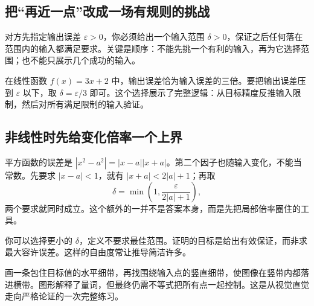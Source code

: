 \subsection*{把“再近一点”改成一场有规则的挑战}
对方先指定输出误差 $\varepsilon>0$，你必须给出一个输入范围 $\delta>0$，保证之后任何落在范围内的输入都满足要求。关键是顺序：不能先挑一个有利的输入，再为它选择范围；也不能只展示几个成功的输入。

在线性函数 $f(x)=3x+2$ 中，输出误差恰为输入误差的三倍。要把输出误差压到 $\varepsilon$ 以下，取 $\delta=\varepsilon/3$ 即可。这个选择展示了完整逻辑：从目标精度反推输入限制，然后对所有满足限制的输入验证。

\subsection*{非线性时先给变化倍率一个上界}
平方函数的误差是 $|x^2-a^2|=|x-a||x+a|$。第二个因子也随输入变化，不能当常数。先要求 $|x-a|<1$，就有 $|x+a|<2|a|+1$；再取
\[\delta=\min\!\left(1,\frac{\varepsilon}{2|a|+1}\right),\]
两个要求就同时成立。这个额外的一并不是答案本身，而是先把局部倍率圈住的工具。

你可以选择更小的 $\delta$，定义不要求最佳范围。证明的目标是给出有效保证，而非求最大容许误差。这样的自由度常让推导简洁许多。

画一条包住目标值的水平细带，再找围绕输入点的竖直细带，使图像在竖带内都落进横带。图形解释了量词，但最终仍需不等式把所有点一起控制。这是从视觉直觉走向严格论证的一次完整练习。
